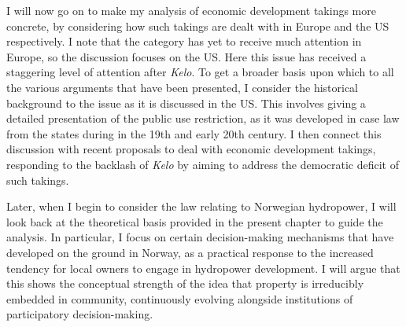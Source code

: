 I will now go on to make my analysis of economic development takings more concrete, by considering how such takings are dealt with in Europe and the US respectively. I note that the category has yet to receive much attention in Europe, so the discussion focuses on the US. Here this issue has received a staggering level of attention after {\it Kelo}. To get a broader basis upon which to  all the various arguments that have been presented, I consider the historical background to the issue as it is discussed in the US. This involves giving a detailed presentation of the public use restriction, as it was developed in case law from the states during in the 19th and early 20th century. I then connect this discussion with recent proposals to deal with economic development takings, responding to the backlash of {\it Kelo} by aiming to address the democratic deficit of such takings.

Later, when I begin to consider the law relating to Norwegian hydropower, I will look back at the theoretical basis provided in the present chapter to guide the analysis. In particular, I focus on certain decision-making mechanisms that have developed on the ground in Norway, as a practical response to the increased tendency for local owners to engage in hydropower development. I will argue that this shows the conceptual strength of the idea that property is irreducibly embedded in community, continuously evolving alongside institutions of participatory decision-making.